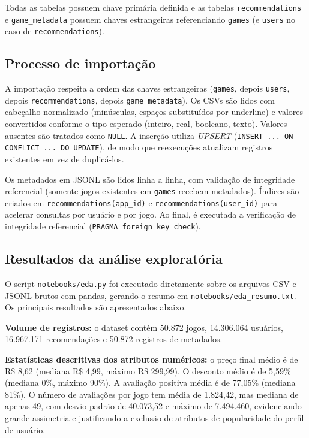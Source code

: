 \documentclass[12pt,a4paper]{article}
\begin{document}
Todas as tabelas possuem chave primária definida e as tabelas \texttt{recommendations} e \texttt{game\_metadata} possuem chaves estrangeiras referenciando \texttt{games} (e \texttt{users} no caso de \texttt{recommendations}).

\subsection{Processo de importação}

A importação respeita a ordem das chaves estrangeiras (\texttt{games}, depois \texttt{users}, depois \texttt{recommendations}, depois \texttt{game\_metadata}). Os CSVs são lidos com cabeçalho normalizado (minúsculas, espaços substituídos por underline) e valores convertidos conforme o tipo esperado (inteiro, real, booleano, texto). Valores ausentes são tratados como \texttt{NULL}. A inserção utiliza \emph{UPSERT} (\texttt{INSERT ... ON CONFLICT ... DO UPDATE}), de modo que reexecuções atualizam registros existentes em vez de duplicá-los.

Os metadados em JSONL são lidos linha a linha, com validação de integridade referencial (somente jogos existentes em \texttt{games} recebem metadados). Índices são criados em \texttt{recommendations(app\_id)} e \texttt{recommendations(user\_id)} para acelerar consultas por usuário e por jogo. Ao final, é executada a verificação de integridade referencial (\texttt{PRAGMA foreign\_key\_check}).

\subsection{Resultados da análise exploratória}

O script \texttt{notebooks/eda.py} foi executado diretamente sobre os arquivos CSV e JSONL brutos com pandas, gerando o resumo em \texttt{notebooks/eda\_resumo.txt}. Os principais resultados são apresentados abaixo.

\textbf{Volume de registros:} o dataset contém 50.872 jogos, 14.306.064 usuários, 16.967.171 recomendações e 50.872 registros de metadados.

\textbf{Estatísticas descritivas dos atributos numéricos:} o preço final médio é de R\$ 8,62 (mediana R\$ 4,99, máximo R\$ 299,99). O desconto médio é de 5,59\% (mediana 0\%, máximo 90\%). A avaliação positiva média é de 77,05\% (mediana 81\%). O número de avaliações por jogo tem média de 1.824,42, mas mediana de apenas 49, com desvio padrão de 40.073,52 e máximo de 7.494.460, evidenciando grande assimetria e justificando a exclusão de atributos de popularidade do perfil de usuário.
\end{document}
